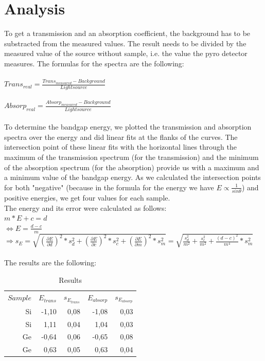 \section{Analysis}
To get a transmission and an absorption coefficient, the background has to be substracted from the measured values. The result needs to be divided by the measured value of the source without sample, i.e. the value the pyro detector measures. The formulas for the spectra are the following:\\
\\
$Trans_{real}=\frac{Trans_{measured}-Background}{Lightsource}$\\  
\\                         $Absorp_{real}=\frac{Absorp_{measured}-Background}{Lightsource}$\\
\\
To determine the bandgap energy, we plotted the transmission and absorption spectra over the energy and did linear fits at the flanks of the curves. The intersection point of these linear fits with the horizontal lines through the maximum of the transmission spectrum (for the transmission) and the minimum of the absorption spectrum (for the absorption) provide us with a maximum and a minimum value of the bandgap energy. As we calculated the intersection points for both "negative" (because in the formula for the energy we have $E\propto\frac{1}{sin\theta}$) and positive energies, we get four values for each sample.\\
The energy and its error were calculated as follows:\\
$m*E+c=d$\\
$\Leftrightarrow E=\frac{d-c}{m}$\\
$\Rightarrow s_{E}=\sqrt{(\frac{\partial{E}}{\partial{d}})^2*s_{d}^2+(\frac{\partial{E}}{\partial{c}})^2*s_{c}^2+(\frac{\partial{E}}{\partial{m}})^2*s_{m}^2}=\sqrt{\frac{s_{d}^2}{m^2}+\frac{s_{c}^2}{m^2}+\frac{(d-c)^2}{m^4}*s_{m}^2}$\\
\\
The results are the following:\\
\begin{table}[htbp]
  \centering
  \caption{Results}
    \begin{tabular}{rrrrr}
    $Sample$ & $E_{trans}$  & $s_{E_{trans}}$ & $E_{absorp}$ & $s_{E_{absorp}}$ \\
    Si    & -1,10  & 0,08  & -1,08 & 0,03 \\
    Si    & 1,11  & 0,04  & 1,04  & 0,03 \\
    Ge    & -0,64 & 0,06  & -0,65 & 0,08 \\
    Ge    & 0,63  & 0,05  & 0,63  & 0,04 \\
    \end{tabular}%
  \label{tab:addlabelx}%
\end{table}%
